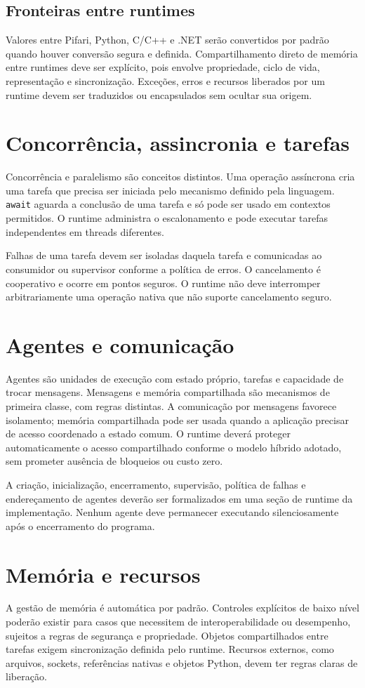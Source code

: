 \documentclass[12pt,a4paper]{article}
\begin{document}
\subsection{Fronteiras entre runtimes}
Valores entre Pifari, Python, C/C++ e .NET serão convertidos por padrão quando houver conversão segura e definida. Compartilhamento direto de memória entre runtimes deve ser explícito, pois envolve propriedade, ciclo de vida, representação e sincronização. Exceções, erros e recursos liberados por um runtime devem ser traduzidos ou encapsulados sem ocultar sua origem.

\section{Concorrência, assincronia e tarefas}
Concorrência e paralelismo são conceitos distintos. Uma operação assíncrona cria uma tarefa que precisa ser iniciada pelo mecanismo definido pela linguagem. \texttt{await} aguarda a conclusão de uma tarefa e só pode ser usado em contextos permitidos. O runtime administra o escalonamento e pode executar tarefas independentes em threads diferentes.

Falhas de uma tarefa devem ser isoladas daquela tarefa e comunicadas ao consumidor ou supervisor conforme a política de erros. O cancelamento é cooperativo e ocorre em pontos seguros. O runtime não deve interromper arbitrariamente uma operação nativa que não suporte cancelamento seguro.

\section{Agentes e comunicação}
Agentes são unidades de execução com estado próprio, tarefas e capacidade de trocar mensagens. Mensagens e memória compartilhada são mecanismos de primeira classe, com regras distintas. A comunicação por mensagens favorece isolamento; memória compartilhada pode ser usada quando a aplicação precisar de acesso coordenado a estado comum. O runtime deverá proteger automaticamente o acesso compartilhado conforme o modelo híbrido adotado, sem prometer ausência de bloqueios ou custo zero.

A criação, inicialização, encerramento, supervisão, política de falhas e endereçamento de agentes deverão ser formalizados em uma seção de runtime da implementação. Nenhum agente deve permanecer executando silenciosamente após o encerramento do programa.

\section{Memória e recursos}
A gestão de memória é automática por padrão. Controles explícitos de baixo nível poderão existir para casos que necessitem de interoperabilidade ou desempenho, sujeitos a regras de segurança e propriedade. Objetos compartilhados entre tarefas exigem sincronização definida pelo runtime. Recursos externos, como arquivos, sockets, referências nativas e objetos Python, devem ter regras claras de liberação.
\end{document}
